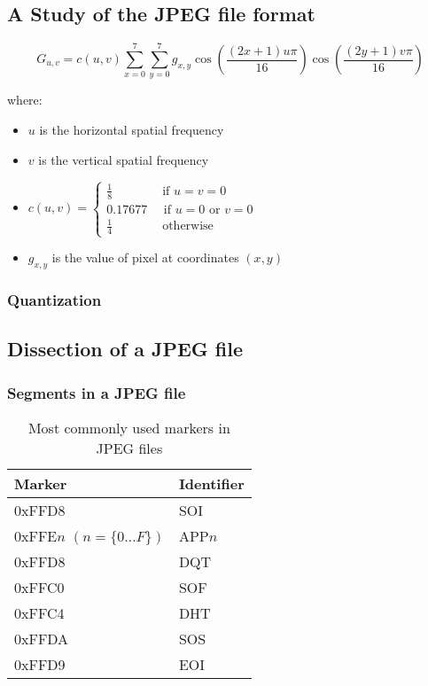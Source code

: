 \begin{infobox}{\section[A Study of the JPEG file format]{A Study of the JPEG file format}}
$$ G_{u,v} = c(u,v)\sum_{x=0}^{7}\sum_{y=0}^{7}g_{x,y}\cos{\left(\frac{(2x+1)u\pi}{16}\right)}\cos{\left(\frac{(2y+1)v\pi}{16}\right)} $$

where:
\begin{itemize}
	\item $u$ is the horizontal spatial frequency 
	\item $v$ is the vertical spatial frequency 
	\item $c(u,v) = \begin{cases}\frac{1}{8} \quad \quad \quad \quad\text{if } u=v=0\\ 
	                             0.17677 \quad \text{ if } u = 0 \text{ or } v = 0\\
	                             \frac{1}{4} \quad \quad \quad \quad\text{otherwise}
	                             \end{cases} $
    \item $g_{x,y}$ is the value of pixel at coordinates $(x,y)$ 
\end{itemize}

\subsubsection*{Quantization}

\subsection*{Dissection of a JPEG file}
\subsubsection*{Segments in a JPEG file}
\begin{wraptable}{r}{5.5cm}
\caption{Most commonly used markers in JPEG files}
\label{tab:markers}
\begin{tabular}{|p{2.7cm}|l|}
\hline
Marker & Identifier\\ \hline
0xFFD8 & SOI\\ \hline
0xFFE$n$ \newline$(n = \{0 \ldots F\})$ & APP$n$\\ \hline
0xFFD8 & DQT \\ \hline
0xFFC0 & SOF \\ \hline
0xFFC4 & DHT\\ \hline
0xFFDA & SOS\\ \hline
0xFFD9 & EOI\\ \hline 
\end{tabular}
\end{wraptable}


\end{infobox}
